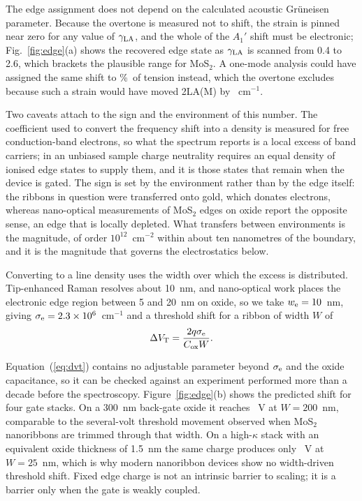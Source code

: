 \documentclass[aip,apl,amsmath,amssymb,reprint,longbibliography]{revtex4-1}
\begin{document}
The edge assignment does not depend on the calculated acoustic Gr\"uneisen
parameter. Because the overtone is measured not to shift, the strain is pinned
near zero for any value of $\gamma_{\rm LA}$, and the whole of the $A_1'$
shift must be electronic; Fig.~\ref{fig:edge}(a) shows the recovered edge
state as $\gamma_{\rm LA}$ is scanned from 0.4 to 2.6, which brackets the
plausible range for MoS$_2$. A one-mode analysis could have
assigned the same shift to \NaiveStrain\%\ of tension instead, which the
overtone excludes because such a strain would have moved 2LA(M) by
\NaiveTwoLA~cm$^{-1}$.

Two caveats attach to the sign and the environment of this number. The
coefficient used to convert the frequency shift into a density is measured for
free conduction-band electrons, so what the spectrum reports is a local excess
of band carriers; in an unbiased sample charge neutrality requires an equal
density of ionised edge states to supply them, and it is those states that
remain when the device is gated. The sign is set by the environment rather
than by the edge itself: the ribbons in question were transferred onto gold,
which donates electrons, whereas nano-optical measurements of MoS$_2$ edges on
oxide report the opposite sense, an edge that is locally
depleted.\cite{Su2019,Sousa2024} What transfers between environments is the
magnitude, of order $10^{12}$~cm$^{-2}$ within about ten nanometres of the
boundary, and it is the magnitude that governs the electrostatics below.

Converting to a line density uses the width over which the excess is
distributed. Tip-enhanced Raman resolves about 10~nm, and nano-optical work
places the electronic edge region between 5 and 20~nm on
oxide,\cite{Su2019,Wu2016} so we take $w_{\rm e}=10$~nm, giving
$\sigma_{\rm e}=2.3\times 10^{6}$~cm$^{-1}$ and a threshold shift for a ribbon of
width $W$ of
\begin{equation}
\Delta V_{\rm T}=\frac{2q\sigma_{\rm e}}{C_{\rm ox}W}.
\label{eq:dvt}
\end{equation}

Equation~(\ref{eq:dvt}) contains no adjustable parameter beyond
$\sigma_{\rm e}$ and the oxide capacitance, so it can be checked against an
experiment performed more than a decade before the spectroscopy. Figure~\ref{fig:edge}(b) shows the predicted
shift for four gate stacks. On a 300~nm back-gate oxide it reaches
\dVTLiu~V at $W=200$~nm, comparable to the several-volt threshold movement
observed when MoS$_2$ nanoribbons are trimmed through that
width.\cite{LiuEDL2012} On a
high-$\kappa$ stack with an equivalent oxide thickness of 1.5~nm the same
charge produces only \dVTHfO~V at $W=25$~nm, which is why modern nanoribbon
devices show no width-driven threshold shift.\cite{Pena2026} Fixed edge charge
is not an intrinsic barrier to scaling; it is a barrier only when the gate is
weakly coupled.
\end{document}
